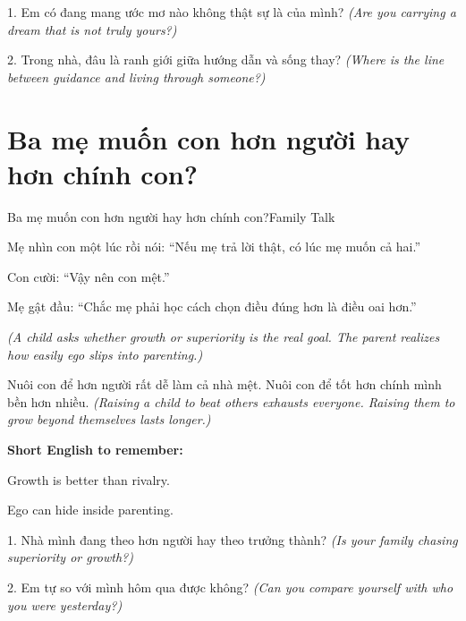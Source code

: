\begin{tuhocnhanh}
1. Em có đang mang ước mơ nào không thật sự là của mình? \textit{(Are you carrying a dream that is not truly yours?)}

2. Trong nhà, đâu là ranh giới giữa hướng dẫn và sống thay? \textit{(Where is the line between guidance and living through someone?)}
\end{tuhocnhanh}
\ngancach

\section{Ba mẹ muốn con hơn người hay hơn chính con?}
\begin{truyen}{Ba mẹ muốn con hơn người hay hơn chính con?}{Family Talk}

Mẹ nhìn con một lúc rồi nói: ``Nếu mẹ trả lời thật, có lúc mẹ muốn cả hai.''

Con cười: ``Vậy nên con mệt.''

Mẹ gật đầu: ``Chắc mẹ phải học cách chọn điều đúng hơn là điều oai hơn.''

\textit{(A child asks whether growth or superiority is the real goal. The parent realizes how easily ego slips into parenting.)}
\end{truyen}

\begin{baihoc}
Nuôi con để hơn người rất dễ làm cả nhà mệt. Nuôi con để tốt hơn chính mình bền hơn nhiều.
\textit{(Raising a child to beat others exhausts everyone. Raising them to grow beyond themselves lasts longer.)}
\end{baihoc}

\begin{ghinhoanh}
\textbf{Short English to remember:}

Growth is better than rivalry.

Ego can hide inside parenting.
\end{ghinhoanh}

\begin{tuhocnhanh}
1. Nhà mình đang theo hơn người hay theo trưởng thành? \textit{(Is your family chasing superiority or growth?)}

2. Em tự so với mình hôm qua được không? \textit{(Can you compare yourself with who you were yesterday?)}
\end{tuhocnhanh}
\ngancach

